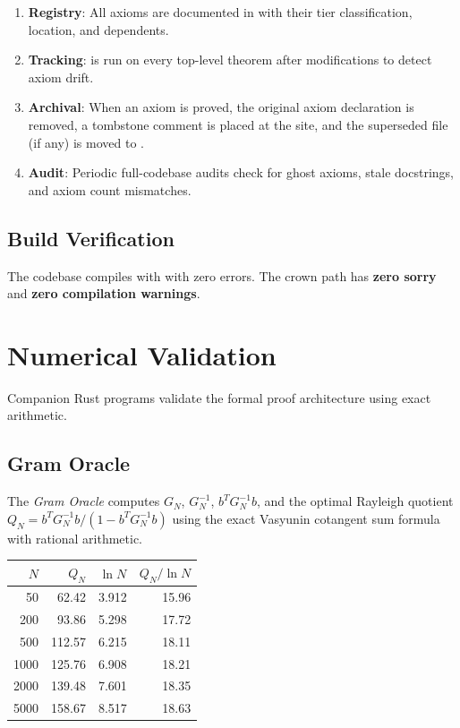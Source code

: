 \documentclass[11pt,a4paper]{article}
\begin{document}
\begin{enumerate}
  \item \textbf{Registry}: All axioms are documented in
     with their tier classification, location,
    and dependents.
  \item \textbf{Tracking}:  is run on every
    top-level theorem after modifications to detect axiom drift.
  \item \textbf{Archival}: When an axiom is proved, the original
    axiom declaration is removed, a tombstone comment is placed
    at the site, and the superseded file (if any) is moved to
    .
  \item \textbf{Audit}: Periodic full-codebase audits check for
    ghost axioms, stale docstrings, and axiom count mismatches.
\end{enumerate}

\subsection{Build Verification}

The codebase compiles with  with zero
errors. The crown path has \textbf{zero sorry} and
\textbf{zero compilation warnings}.

\section{Numerical Validation}
\label{sec:numerical}

Companion Rust programs validate the formal proof architecture using
exact arithmetic.

\subsection{Gram Oracle}

The \emph{Gram Oracle} computes $G_N$, $G_N^{-1}$, $b^T G_N^{-1} b$,
and the optimal Rayleigh quotient $Q_N = b^T G_N^{-1} b / (1 - b^T G_N^{-1} b)$
using the exact Vasyunin cotangent sum formula with rational arithmetic.

\begin{center}
\begin{tabular}{@{}rrcr@{}}
\toprule
$N$ & $Q_N$ & $\ln N$ & $Q_N / \ln N$ \\
\midrule
50 & 62.42 & 3.912 & 15.96 \\
200 & 93.86 & 5.298 & 17.72 \\
500 & 112.57 & 6.215 & 18.11 \\
1000 & 125.76 & 6.908 & 18.21 \\
2000 & 139.48 & 7.601 & 18.35 \\
5000 & 158.67 & 8.517 & 18.63 \\
\bottomrule
\end{tabular}
\end{center}
\end{document}
